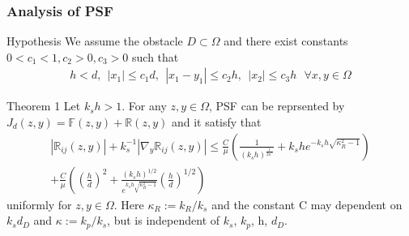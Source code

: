 \documentclass[utf-8,8pt]{beamer}
\newcommand{\R}{\mathbb{R}}
\newcommand{\na}{\nabla}
\newcommand{\Om}{\Omega}
\newcommand{\F}{\mathbb{F}}
\newcommand{\ben}{\begin{eqnarray*}}
\newcommand{\een}{\end{eqnarray*}}
\begin{document}
\begin{frame}
\frametitle{Analysis of PSF}
\begin{block}{Hypothesis}
 We assume the obstacle $D\subset\Omega$ and there exist constants $0<c_1<1,c_2>0,c_3>0$ such that
\ben\label{convention_2}
h<d, \ \ |x_1|\leq c_1 d , \ \ |x_1-y_1|\leq c_2 h , \ \
|x_2|\leq c_3 h    \ \ \ \forall x,y \in \Omega
\een
\end{block}
\begin{block}{Theorem 1}
	Let $k_s h>1$. For any $z,y\in\Om$, PSF can be reprsented by  $J_d(z,y)=\F(z,y)+\R(z,y)$ and it satisfy that
	\ben
	|\R_{ij}(z,y)|+k_s^{-1}|\na_y \R_{ij}(z,y)|\leq \frac{C}{\mu}(\frac{1}{(k_s h)^{\frac{1}{2n^*}}}
    +k_she^{-k_s h\sqrt{\kappa_R^2-1}}) \\ +\frac{C}{\mu} ((\frac{h}{d})^{2}+\frac{(k_s h)^{1/2}}{ e^{k_s h\sqrt{\kappa_R^2-1}}}(\frac{h}{d})^{1/2})
	\een
	uniformly for $z,y\in\Om$. Here $\kappa_R:=k_R/k_s$ and the constant C may dependent on $k_s d_D$ and $\kappa:=k_p/k_s$, but is independent of $k_s$, $k_p$, h, $d_D$.
\end{block}
\end{frame}
\end{document}
